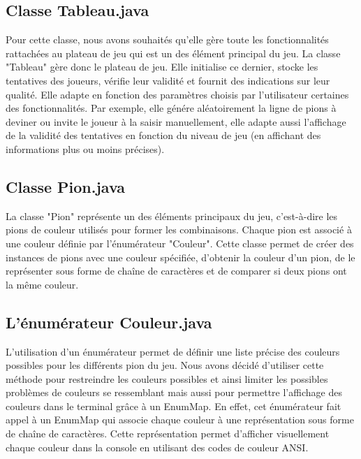 \documentclass[french]{article}
\begin{document}
\subsection{Classe Tableau.java}
Pour cette classe, nous avons souhaités qu'elle gère toute les fonctionnalités rattachées au plateau de jeu qui est un des élément principal du jeu. La classe "Tableau" gère donc le plateau de jeu. Elle initialise ce dernier, stocke les tentatives des joueurs, vérifie leur validité et fournit des indications sur leur qualité. Elle adapte en fonction des paramètres choisis par l'utilisateur certaines des fonctionnalités. Par exemple, elle génére aléatoirement la ligne de pions à deviner ou invite le joueur à la saisir manuellement, elle adapte aussi l'affichage de la validité des tentatives en fonction du niveau de jeu (en affichant des informations plus ou moins précises).

\subsection{Classe Pion.java}
La classe "Pion" représente un des éléments principaux du jeu, c'est-à-dire les pions de couleur utilisés pour former les combinaisons. Chaque pion est associé à une couleur définie par l'énumérateur "Couleur". Cette classe permet de créer des instances de pions avec une couleur spécifiée, d'obtenir la couleur d'un pion, de le représenter sous forme de chaîne de caractères et de comparer si deux pions ont la même couleur.

\subsection{L'énumérateur Couleur.java}
L'utilisation d'un énumérateur permet de définir une liste précise des couleurs possibles pour les différents pion du jeu. Nous avons décidé d'utiliser cette méthode pour restreindre les couleurs possibles et ainsi limiter les possibles problèmes de couleurs se ressemblant mais aussi pour permettre l'affichage des couleurs dans le terminal grâce à un EnumMap. En effet, cet énumérateur fait appel à un EnumMap qui associe chaque couleur à une représentation sous forme de chaîne de caractères. Cette représentation permet d'afficher visuellement chaque couleur dans la console en utilisant des codes de couleur ANSI.
\end{document}
